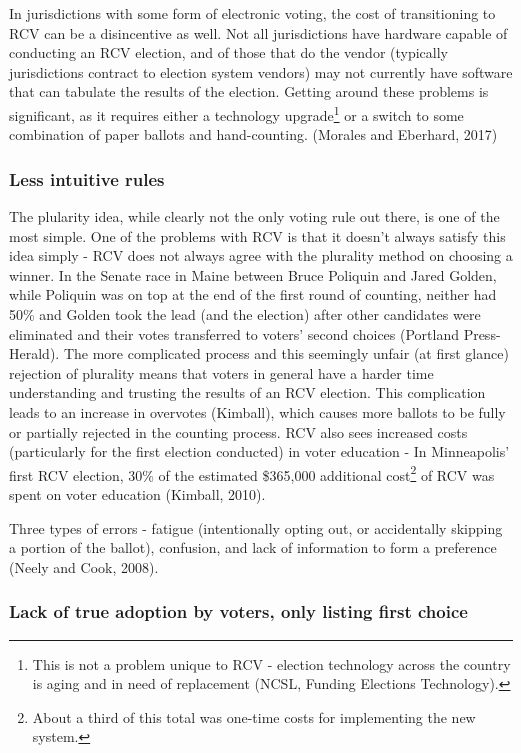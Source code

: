\documentclass[12pt,twoside]{reedthesis}
\theoremstyle{definition}
\theoremstyle{definition}
\theoremstyle{definition}
\theoremstyle{remark}
\begin{document}
In jurisdictions with some form of electronic voting, the cost of
transitioning to RCV can be a disincentive as well. Not all
jurisdictions have hardware capable of conducting an RCV election, and
of those that do the vendor (typically jurisdictions contract to
election system vendors) may not currently have software that can
tabulate the results of the election. Getting around these problems is
significant, as it requires either a technology upgrade\footnote{This is
  not a problem unique to RCV - election technology across the country
  is aging and in need of replacement (NCSL, Funding Elections
  Technology).} or a switch to some combination of paper ballots and
hand-counting. (Morales and Eberhard, 2017)

\hypertarget{less-intuitive-rules}{%
\subsubsection{Less intuitive rules}\label{less-intuitive-rules}}

The plularity idea, while clearly not the only voting rule out there, is
one of the most simple. One of the problems with RCV is that it doesn't
always satisfy this idea simply - RCV does not always agree with the
plurality method on choosing a winner. In the Senate race in Maine
between Bruce Poliquin and Jared Golden, while Poliquin was on top at
the end of the first round of counting, neither had 50\% and Golden took
the lead (and the election) after other candidates were eliminated and
their votes transferred to voters' second choices (Portland
Press-Herald). The more complicated process and this seemingly unfair
(at first glance) rejection of plurality means that voters in general
have a harder time understanding and trusting the results of an RCV
election. This complication leads to an increase in overvotes (Kimball),
which causes more ballots to be fully or partially rejected in the
counting process. RCV also sees increased costs (particularly for the
first election conducted) in voter education - In Minneapolis' first RCV
election, 30\% of the estimated \$365,000 additional cost\footnote{About
  a third of this total was one-time costs for implementing the new
  system.} of RCV was spent on voter education (Kimball, 2010).

Three types of errors - fatigue (intentionally opting out, or
accidentally skipping a portion of the ballot), confusion, and lack of
information to form a preference (Neely and Cook, 2008).

\hypertarget{lack-of-true-adoption-by-voters-only-listing-first-choice}{%
\subsubsection{Lack of true adoption by voters, only listing first
choice}\label{lack-of-true-adoption-by-voters-only-listing-first-choice}}
\end{document}
